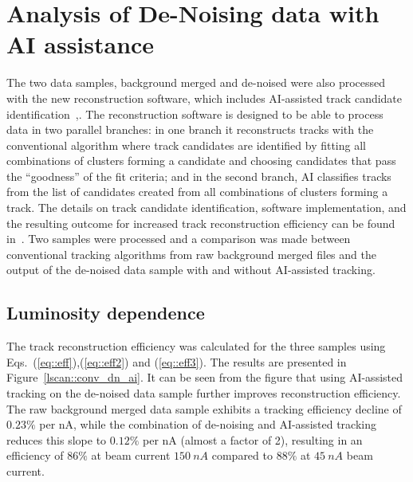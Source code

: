 \section{Analysis of De-Noising data with AI assistance}

The two data samples, background merged and de-noised were also processed with the new 
reconstruction software, which includes AI-assisted track candidate identification~\cite{Gavalian:2020oxg},\cite{Gavalian:2020xmc}. 
The reconstruction software is designed to be able to process data in two parallel branches: in one 
branch it reconstructs tracks with the conventional algorithm where track candidates are identified by fitting all 
combinations of clusters forming a candidate and choosing candidates that pass the ``goodness'' of the fit criteria; 
 and in the second branch, AI classifies tracks from the list of candidates created from all combinations of clusters 
 forming a track. 
 The details on track candidate identification, software implementation, and the resulting outcome for increased 
 track reconstruction efficiency can be found in~\cite{Gavalian:2022hfa}.
 Two samples were processed and a comparison was made between conventional tracking algorithms from raw 
 background merged files and the output of the de-noised data sample with and without AI-assisted tracking. 

\subsection{Luminosity dependence}

The track reconstruction efficiency was calculated for the three samples using Eqs.~(\ref{eq::eff}),(\ref{eq::eff2}) and (\ref{eq::eff3}).
The results are presented in Figure~\ref{lscan::conv_dn_ai}. It can be seen from the figure that using 
AI-assisted tracking on the de-noised data sample further improves reconstruction efficiency. The raw background 
merged data sample exhibits a tracking efficiency decline of $0.23\%$ per nA, while the combination of de-noising 
and AI-assisted tracking reduces this slope to $0.12\%$ per nA (almost a factor of 2), resulting in an efficiency of $86\%$ at
 beam current $150~nA$ compared to $88\%$ at $45~nA$ beam current. 

